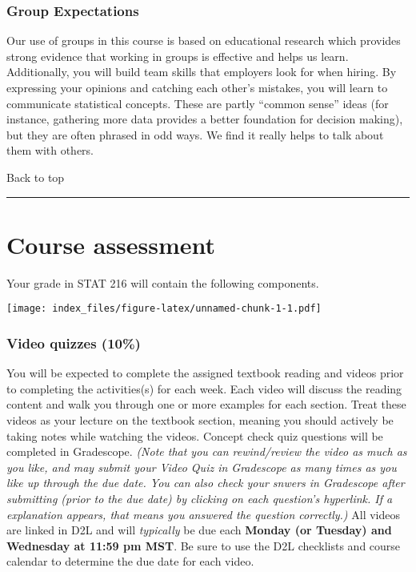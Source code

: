 \documentclass[
]{article}
\begin{document}
\subsubsection{Group Expectations}\label{group-expectations}

Our use of groups in this course is based on educational research which
provides strong evidence that working in groups is effective and helps
us learn. Additionally, you will build team skills that employers look
for when hiring. By expressing your opinions and catching each other's
mistakes, you will learn to communicate statistical concepts. These are
partly ``common sense'' ideas (for instance, gathering more data
provides a better foundation for decision making), but they are often
phrased in odd ways. We find it really helps to talk about them with
others.

Back to top

\begin{center}\rule{0.5\linewidth}{0.5pt}\end{center}

\section{Course assessment}\label{course-assessment}

Your grade in STAT 216 will contain the following components.

\texttt{[image: index\_files/figure-latex/unnamed-chunk-1-1.pdf]}

\subsubsection{Video quizzes (10\%)}\label{video-quizzes-10}

You will be expected to complete the assigned textbook reading and
videos prior to completing the activities(s) for each week. Each video
will discuss the reading content and walk you through one or more
examples for each section. Treat these videos as your lecture on the
textbook section, meaning you should actively be taking notes while
watching the videos. Concept check quiz questions will be completed in
Gradescope. \emph{(Note that you can rewind/review the video as much as
you like, and may submit your Video Quiz in Gradescope as many times as
you like up through the due date. You can also check your snwers in
Gradescope after submitting (prior to the due date) by clicking on each
question's hyperlink. If a explanation appears, that means you answered
the question correctly.)} All videos are linked in D2L and will
\emph{typically} be due each \textbf{Monday (or Tuesday) and Wednesday
at 11:59 pm MST}. Be sure to use the D2L checklists and course calendar
to determine the due date for each video.
\end{document}
